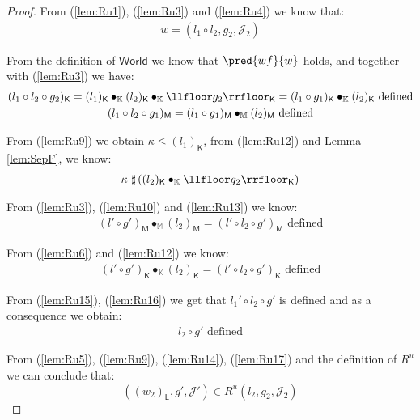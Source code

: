 {\begin{proof}
From (\ref{lem:Ru1}), (\ref{lem:Ru3}) and (\ref{lem:Ru4}) we know that:
\begin{gather}
	\label{lem:Ru11} w = (l_1 \circ l_2, g_2, \mathcal{J}_2)
\end{gather}

From the definition of $\mathsf{World}$ we know that $\pred{wf}{w}$ holds, and together with (\ref{lem:Ru3}) we have:
\begin{gather}
	\label{lem:Ru12} (l_1 \circ l_2 \circ g_2)_\mathsf{K} = (l_1)_\mathsf{K} \bullet_\mathbb{K} (l_2)_\mathsf{K} \bullet_\mathbb{K} \llfloor g_2 \rrfloor_\mathsf{K} = (l_1 \circ g_1)_\mathsf{K} \bullet_\mathbb{K} (l_2)_\mathsf{K} \text{ defined}
	\\
	\label{lem:Ru13} (l_1 \circ l_2 \circ g_1)_\mathsf{M} = (l_1 \circ g_1)_\mathsf{M} \bullet_\mathbb{M} (l_2)_\mathsf{M} \text{ defined}
\end{gather}

From (\ref{lem:Ru9}) we obtain $\kappa \leq (l_1)_\mathsf{K}$, from (\ref{lem:Ru12}) and Lemma \ref{lem:SepF}, we know:
\begin{gather}
	\label{lem:Ru14} \kappa\ \sharp \left( (l_2)_\mathsf{K} \bullet_\mathbb{K} \llfloor g_2 \rrfloor_\mathsf{K} \right)
\end{gather}

From (\ref{lem:Ru3}), (\ref{lem:Ru10}) and (\ref{lem:Ru13}) we know:
\begin{gather}
	\label{lem:Ru15} (l' \circ g')_\mathsf{M} \bullet_\mathbb{M} (l_2)_\mathsf{M} = (l' \circ l_2 \circ g')_\mathsf{M} \text{ defined}
\end{gather}

From (\ref{lem:Ru6}) and (\ref{lem:Ru12}) we know:
\begin{gather}
	\label{lem:Ru16} (l' \circ g')_\mathsf{K} \bullet_\mathbb{K} (l_2)_\mathsf{K} = (l' \circ l_2 \circ g')_\mathsf{K} \text{ defined}
\end{gather}

From (\ref{lem:Ru15}), (\ref{lem:Ru16}) we get that $l_1' \circ l_2 \circ g'$ is defined and as a consequence we obtain:
\begin{gather}
	\label{lem:Ru17} l_2 \circ g' \text{ defined}
\end{gather}

From (\ref{lem:Ru5}), (\ref{lem:Ru9}), (\ref{lem:Ru14}), (\ref{lem:Ru17}) and the definition of $R^u$ we can conclude that:
\[
	((w_2)_\mathsf{L}, g', \mathcal{J}') \in R^u(l_2, g_2, \mathcal{J}_2)
\]
\end{proof}
}

